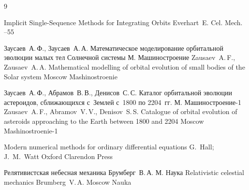 
\begin{thebibliography}{9}

\paper Implicit Single-Sequence Methods for Integrating Orbits
\by Everhart~E.
\jour Cel. Mech.
--55

\by Заусаев~А.\,Ф., Заусаев~А.\,А.
\book Математическое моделирование орбитальной эволюции малых тел Солнечной системы
\publaddr М.
\publ Машиностроение
\misctransl
\by Zausaev~A.\,F., Zausaev~A.\,A.
\book Mathematical modelling of orbital evolution of small bodies of the Solar system
\publaddr Moscow
\publ Mashinostroenie

\by Заусаев~А.\,Ф., Абрамов~В.\,В., Денисов~С.\,С.
\book Каталог орбитальной эволюции астероидов, сближающихся с~Землей с~1800 по 2204~гг.
\publaddr М.
\publ Машиностроение-1
\misctransl
\by Zausaev~A.\,F., Abramov~V.\,V., Denisov~S.\,S.
\book  Catalogue of orbital evolution of asteroids approaching to the Earth between 1800 and 2204
\publaddr Moscow
\publ Mashinostroenie-1




\book Modern numerical methods for ordinary differential equations
\eds G.~Hall; J.~M.~Watt
\publaddr Oxford 
\publ Clarendon Press


\book Релятивистская небесная механика
\by Брумберг~В.\,А.
\publaddr М.
\publ Наука
\misctransl
\book Relativistic celestial mechanics
\by Brumberg~V.\,A.
\publaddr Moscow
\publ Nauka



\end{thebibliography}

\noindent
\hskip6.5cm \thedate \par\noindent
\hskip6.5cm\therevdate


\vspace{-7mm}


%
%
\makeengtitle



 \newpage
%
%
%
